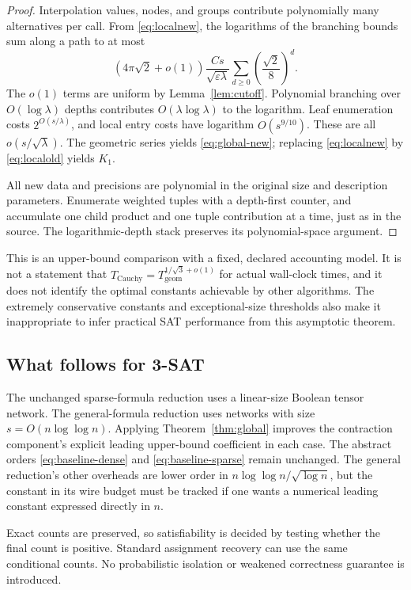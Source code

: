 \documentclass[11pt]{article}
\theoremstyle{remark}
\begin{document}
\begin{proof}
Interpolation values, nodes, and groups contribute polynomially many alternatives per call. From \eqref{eq:localnew}, the logarithms of the branching bounds sum along a path to at most
\[
 (4\pi\sqrt2+o(1))
 \frac{Cs}{\sqrt{\varepsilon\lambda}}
 \sum_{d\ge0}\left(\frac{\sqrt2}{8}\right)^d.
\]
The $o(1)$ terms are uniform by Lemma~\ref{lem:cutoff}. Polynomial branching over $O(\log\lambda)$ depths contributes $O(\lambda\log\lambda)$ to the logarithm. Leaf enumeration costs $2^{O(s/\lambda)}$, and local entry costs have logarithm $O(s^{9/10})$. These are all $o(s/\sqrt\lambda)$. The geometric series yields \eqref{eq:global-new}; replacing \eqref{eq:localnew} by \eqref{eq:localold} yields $K_1$.

All new data and precisions are polynomial in the original size and description parameters. Enumerate weighted tuples with a depth-first counter, and accumulate one child product and one tuple contribution at a time, just as in the source. The logarithmic-depth stack preserves its polynomial-space argument.
\end{proof}

This is an upper-bound comparison with a fixed, declared accounting model. It is not a statement that $T_{\mathrm{Cauchy}}=T_{\mathrm{geom}}^{1/\sqrt3+o(1)}$ for actual wall-clock times, and it does not identify the optimal constants achievable by other algorithms. The extremely conservative constants and exceptional-size thresholds also make it inappropriate to infer practical SAT performance from this asymptotic theorem.

\subsection{What follows for 3-SAT}

The unchanged sparse-formula reduction uses a linear-size Boolean tensor network. The general-formula reduction uses networks with size $s=O(n\log\log n)$. Applying Theorem~\ref{thm:global} improves the contraction component's explicit leading upper-bound coefficient in each case. The abstract orders \eqref{eq:baseline-dense} and \eqref{eq:baseline-sparse} remain unchanged. The general reduction's other overheads are lower order in $n\log\log n/\sqrt{\log n}$, but the constant in its wire budget must be tracked if one wants a numerical leading constant expressed directly in $n$.

Exact counts are preserved, so satisfiability is decided by testing whether the final count is positive. Standard assignment recovery can use the same conditional counts. No probabilistic isolation or weakened correctness guarantee is introduced.
\end{document}
